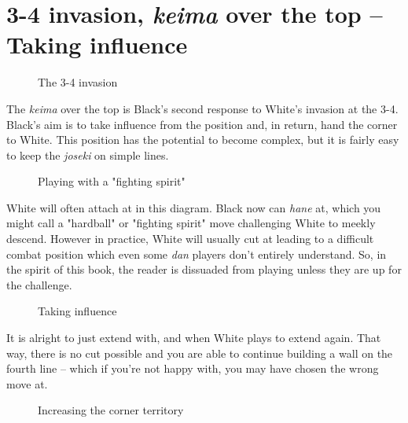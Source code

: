\documentclass[a5paper,12pt,twoside]{book} %
\newcounter{joseki}                 %
\begin{document}
\section{3-4 invasion, \textit{keima} over the top – Taking influence}

\begin{figure}[!htbp]
 
\vspace{-0.6cm}\caption{The 3-4 invasion}
\label{5-4:3-4-invasion}
\end{figure}

The \textit{keima} over the top is Black's second response to White's invasion at the 3-4. Black's aim is to take influence from the position and, in return, hand the corner to White. This position has the potential to become complex, but it is fairly easy to keep the \textit{joseki} on simple lines.\\

\begin{figure}[!htbp]
 
\vspace{-0.6cm}\caption{Playing with a "fighting spirit"}
\label{5-4:fight}
\end{figure}

White will often attach at{\large\whitestone[3]} in this diagram. Black now can \textit{hane} at{\large\blackstone[4]}, which you might call a "hardball" or "fighting spirit" move challenging White to meekly descend. However in practice, White will usually cut at{\large\whitestone[5]} leading to a difficult combat position which even some \textit{dan} players don't entirely understand. So, in the spirit of this book, the reader is dissuaded from playing{\large\blackstone[4]} unless they are up for the challenge.\\

\begin{figure}[!htbp]
 
\vspace{-0.6cm}\caption{Taking influence}
\label{5-4:influence}
\end{figure}

It is alright to just extend with{\large\blackstone[4]}, and when White plays{\large\whitestone[5]} to extend again. That way, there is no cut possible and you are able to continue building a wall on the fourth line – which if you're not happy with, you may have chosen the wrong move at{\large\blackstone[2]}.\\

\begin{figure}[!htbp]
 
\vspace{-0.6cm}\caption{Increasing the corner territory}
\label{5-4:influence-2}
\end{figure}
\end{document}
